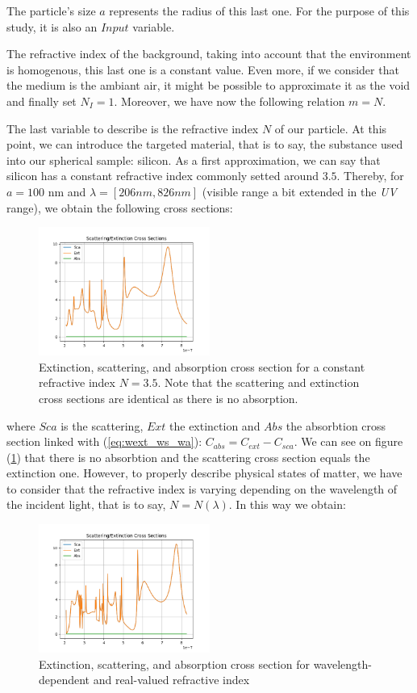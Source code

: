 \documentclass{article}
\numberwithin{equation}{section}
\begin{document}
The particle's size $a$ represents the radius of this last one. For the purpose of this study, it is also an $Input$ variable.

The refractive index of the background, taking into account that the environment is homogenous, this last one is a constant value. Even more, if we consider that the medium is the ambiant air, it might be possible to approximate it as the void and finally set $N_{I}=1$. Moreover, we have now the following relation $m=N$.

The last variable to describe is the refractive index $N$ of our particle. At this point, we can introduce the targeted material, that is to say, the substance used into our spherical sample: silicon. As a first approximation, we can say that silicon has a constant refractive index commonly setted around $3.5$. Thereby, for $a=100$ nm and $\lambda=[206 nm, 826 nm]$ (visible range a bit extended in the \textit{UV} range), we obtain the following cross sections:
\begin{figure}[h!]
    \centering
    \includegraphics[width=0.5\textwidth, height=0.4\textwidth]{ri_const.png}
    \caption{Extinction, scattering, and absorption cross section for a constant refractive index $N=3.5$. Note that the scattering and extinction cross sections are identical as there is no absorption.}
    \label{fig:ri_const}
\end{figure}
where $Sca$ is the scattering, $Ext$ the extinction and $Abs$ the absorbtion cross section linked with (\ref{eq:wext_ws_wa}): $C_{abs} = C_{ext} - C_{sca}$. We can see on figure (\ref{fig:ri_const}) that there is no absorbtion and the scattering cross section equals the extinction one. However, to properly describe physical states of matter, we have to consider that the refractive index is varying depending on the wavelength of the incident light, that is to say, $N=N(\lambda)$. In this way we obtain:
\begin{figure}[h!]
    \centering
    \includegraphics[width=0.5\textwidth, height=0.4\textwidth]{ri_var_real.png}
    \caption{Extinction, scattering, and absorption cross section for wavelength-dependent and real-valued refractive index}
\end{figure}
\end{document}
